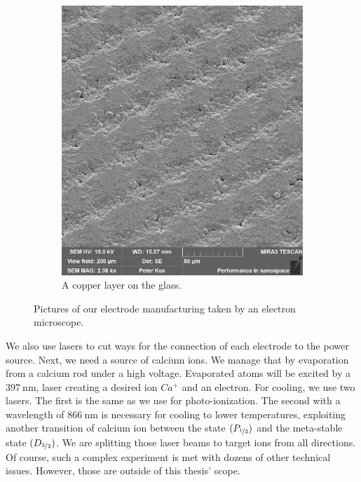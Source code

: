 \begin{figure}[H]
\begin{subfigure}{.465\textwidth}
	\includegraphics[width=\linewidth]{img/200um_copper.pdf}
	\caption{A copper layer on the glass.\\}
	\label{fig:quadrupole picture}
\end{subfigure}
\caption{Pictures of our electrode manufacturing taken by an electron microscope.}
\label{fig:trap manufacturing}
\end{figure}
We also use lasers to cut ways for the connection of each electrode to the power source. Next, we need a source of calcium ions. We manage that by evaporation from a calcium rod under a high voltage. Evaporated atoms will be excited by a $\SI{397}{\nano\meter}$, laser creating a desired ion $Ca^+$ and an electron. For cooling, we use two lasers. The first is the same as we use for photo-ionization. The second with a wavelength of $\SI{866}{\nano\meter}$ is necessary for cooling to lower temperatures, exploiting another transition of calcium ion between the state $(P_{\nicefrac{1}{2}})$ and the meta-stable state $(D_{\nicefrac{3}{2}})$. We are splitting those laser beams to target ions from all directions. Of course, such a complex experiment is met with dozens of other technical issues. However, those are outside of this thesis' scope.